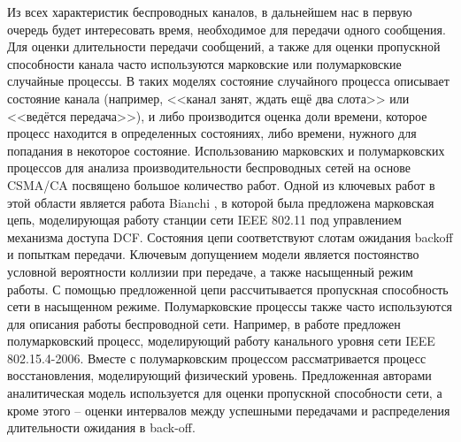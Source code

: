 Из всех характеристик беспроводных каналов, в дальнейшем нас в первую очередь будет интересовать время, необходимое для передачи одного сообщения. Для оценки длительности передачи сообщений, а также для оценки пропускной способности канала часто используются марковские или полумарковские случайные процессы. В таких моделях состояние случайного процесса описывает состояние канала (например, <<канал занят, ждать ещё два слота>> или <<ведётся передача>>), и либо производится оценка доли времени, которое процесс находится в определенных состояниях, либо времени, нужного для попадания в некоторое состояние. Использованию марковских и полумарковских процессов для анализа производительности беспроводных сетей на основе CSMA/CA посвящено большое количество работ. Одной из ключевых работ в этой области является работа Bianchi \cite{Bianchi2000}, в которой была предложена марковская цепь, моделирующая работу станции сети IEEE 802.11 под управлением механизма доступа DCF. Состояния цепи соответствуют слотам ожидания backoff и попыткам передачи. Ключевым допущением модели является постоянство условной вероятности коллизии при передаче, а также насыщенный режим работы. С помощью предложенной цепи рассчитывается пропускная способность сети в насыщенном режиме. Полумарковские процессы также часто используются для описания работы беспроводной сети. Например, в работе \cite{Lauwens2010} предложен полумарковский процесс, моделирующий работу канального уровня сети IEEE 802.15.4-2006. Вместе с полумарковским процессом рассматривается процесс восстановления, моделирующий физический уровень. Предложенная авторами аналитическая модель используется для оценки пропускной способности сети, а кроме этого -- оценки интервалов между успешными передачами и распределения длительности ожидания в back-off.

